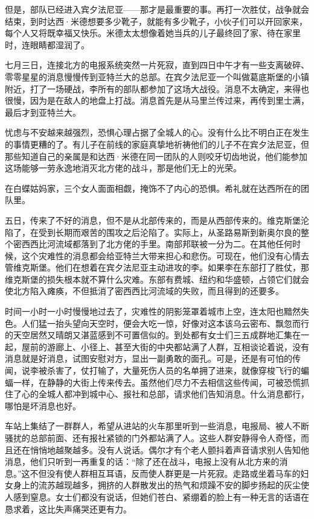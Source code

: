 \par 但是，部队已经进入宾夕法尼亚——那才是最重要的事。再打一次胜仗，战争就会结束，到时达西·米德想要多少靴子，就能有多少靴子，小伙子们可以开回家来，每个人又将既幸福又快乐。米德太太想像着她当兵的儿子最终回了家、待在家里时，连眼睛都湿润了。
\par 七月三日，连接北方的电报系统突然一片死寂，直到四日中午才有一些支离破碎、零零星星的消息慢慢传到亚特兰大的总部。在宾夕法尼亚一个叫做葛底斯堡的小镇附近，打了一场硬战，李所有的部队都参加了这场大战役。消息不太确定，来得也很慢，因为是在敌人的地盘上打战。消息首先是从马里兰传过来，再传到里士满，最后才到亚特兰大。
\par 忧虑与不安越来越强烈，恐惧心理占据了全城人的心。没有什么比不明白正在发生的事情更糟的了。有儿子在前线的家庭真挚地祈祷他们的儿子不在宾夕法尼亚，但那些知道自己的亲属是和达西·米德在同一团队的人则咬牙切齿地说，他们能参加这场能够一劳永逸地消灭北方佬的战斗，那是他们无上的光荣。
\par 在白蝶姑妈家，三个女人面面相觑，掩饰不了内心的恐惧。希礼就在达西所在的团队里。
\par 五日，传来了不好的消息，但不是从北部传来的，而是从西部传来的。维克斯堡沦陷了，在受到长期而艰苦的围攻之后沦陷了。实际上，从圣路易斯到新奥尔良的整个密西西比河流域都落到了北方佬的手里。南部邦联被一分为二。在其他任何时候，这个灾难性的消息都会给亚特兰大带来担心和悲伤。可现在，他们没有心情去管维克斯堡。他们在想着在宾夕法尼亚主动进攻的李。如果李在东部打了胜仗，那维克斯堡的损失根本就不算什么灾难。东部有费城、纽约和华盛顿，占领它们就会使北方陷入瘫痪，不但抵消了密西西比河流域的失败，而且得到的还要多。
\par 时间一小时一小时慢慢地过去了，灾难性的阴影笼罩着城市上空，连太阳也黯然失色。人们猛一抬头望向天空时，便会大吃一惊，好像对这本该乌云密布、飘忽而行的天空居然又晴朗又湛蓝感到不可置信似的。到处都有女士们三五成群地汇集在一起，屋前的游廊上、小径上、甚至大街的中央都站满了人群，互相谈论着说，没有消息就是好消息，试图安慰对方，显出一副勇敢的面孔。可是，还是有可怕的传闻，说李被杀害了，仗打输了，大量死伤人员的名单拥了进来，就像穿梭飞行的蝙蝠一样，在静静的大街上传来传去。虽然他们尽力不去相信这些传闻，可被恐慌抓住了心的全城人都冲到城中心、报社和总部，请求他们告知消息。什么消息都行，哪怕是坏消息也好。
\par 车站上集结了一群群人，希望从进站的火车那里听到一些消息，电报局、被人不断骚扰的总部前面、还有报社紧锁的门外都站满了人。这些人群安静得令人奇怪，而且还在悄悄地越聚越多。没有人说话。偶尔才有个老人颤抖着声音请求别人告知他消息，他们只听到一再重复的话：“除了还在战斗，电报上没有从北方来的消息。”这不但没有使人群相互耳语，反而使人群更是一片死寂。走路或坐着马车的妇女身上的流苏越现越多，拥挤的人群散发出的热气和烦躁不安的脚步扬起的灰尘使人感到窒息。女士们都没有说话，但她们苍白、紧绷着的脸上有一种无言的话语在恳求着，这比失声痛哭还更有力。
